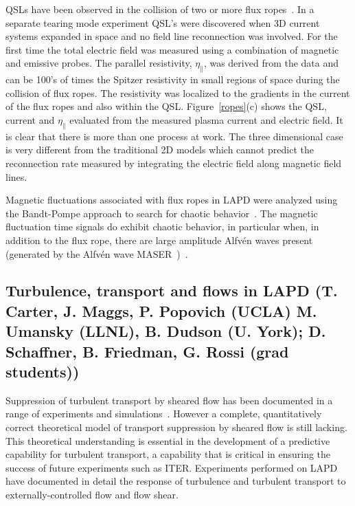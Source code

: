 \documentclass[11pt]{article}
\renewcommand{\cite}{\citep}
\begin{document}
QSLs have been observed in the collision of two or more flux
ropes~\cite{gekelman:2010,vancompernolle:2011}. In a separate tearing mode experiment QSL's
were discovered when 3D current systems expanded in space and no field
line reconnection was involved. For the first time the total electric
field was measured using a
combination of magnetic and emissive probes. The parallel resistivity,
$\eta_\parallel$, was derived from the data and can
be 100's of times the Spitzer resistivity in small regions of space
during the collision of flux ropes. The resistivity was localized to the
gradients in the current of the flux ropes and also within the QSL.
Figure~\ref{ropes}(c) shows the QSL, current and $\eta_\parallel$
evaluated from the measured plasma current and electric field.
It is clear that there is more than one process at work. The three
dimensional case is very different from the traditional 2D models which
cannot predict the reconnection rate measured by integrating the
electric field along magnetic field lines.

Magnetic fluctuations associated with flux ropes
in LAPD were analyzed using the Bandt-Pompe approach to search for chaotic
behavior~\cite{bandt:2002,rosso:2007}.  The magnetic fluctuation time
signals do exhibit chaotic behavior, in particular when, in addition
to the flux rope, there are large amplitude Alfv\'{e}n waves present
(generated by the Alfv\'{e}n wave
MASER~\cite{maggs:2003,maggs:2005})~\cite{gekelman:2014}.


\subsection{Turbulence, transport and flows in LAPD (T. Carter, J. Maggs, P.
Popovich (UCLA) M. Umansky (LLNL), B. Dudson (U. York); D. Schaffner, B.
Friedman, G. Rossi (grad students))}

Suppression of turbulent transport by sheared flow has been documented
in a range of experiments and simulations~\cite{terry:2000}.  However
a complete, quantitatively correct theoretical model of transport
suppression by sheared flow is still lacking.  This theoretical understanding is
essential in the development of a predictive capability for turbulent
transport, a capability that is critical in ensuring the success of
future experiments such as ITER. Experiments performed on LAPD have
documented in detail the response of turbulence and turbulent
transport to externally-controlled flow and flow shear.
\end{document}
